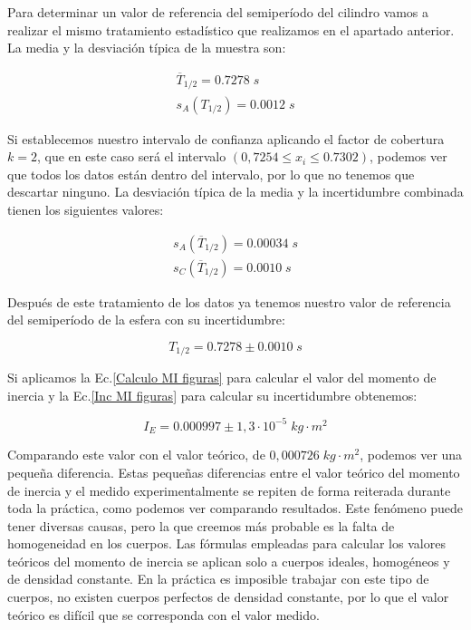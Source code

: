 \documentclass[a4paper,12pt,titlepage]{article}
\begin{document}
Para determinar un valor de referencia del semiperíodo del cilindro vamos a realizar el mismo tratamiento estadístico que realizamos en el apartado anterior. La media y la desviación típica de la muestra son:

\begin{equation}
    \begin{gathered}
        \overline{T}_{1/2} = 0.7278 \; s\\
        s_A(T_{1/2}) = 0.0012 \; s
    \end{gathered}
\end{equation}

Si establecemos nuestro intervalo de confianza aplicando el factor de cobertura $k=2$, que en este caso será el intervalo $(0,7254 \leq x_i \leq 0.7302)$, podemos ver que todos los datos están dentro del intervalo, por lo que no tenemos que descartar ninguno. La desviación típica de la media y la incertidumbre combinada tienen los siguientes valores:

\begin{equation}
    \begin{gathered}
        s_A(\overline{T}_{1/2}) = 0.00034 \; s\\
        s_C(\overline{T}_{1/2}) = 0.0010 \; s
    \end{gathered}
\end{equation}

Después de este tratamiento de los datos ya tenemos nuestro valor de referencia del semiperíodo de la esfera con su incertidumbre:

\begin{equation}
    T_{1/2} = 0.7278 \pm 0.0010 \; s
\end{equation}

Si aplicamos la Ec.\ref{Calculo MI figuras} para calcular el valor del momento de inercia y la Ec.\ref{Inc MI figuras} para calcular su incertidumbre obtenemos:

\begin{equation}
    I_E = 0.000997 \pm  1,3 \cdot 10^{-5} \;kg\cdot m^2
\end{equation}

Comparando este valor con el valor teórico, de $0,000726 \; kg \cdot m^2$, podemos ver una pequeña diferencia. Estas pequeñas diferencias entre el valor teórico del momento de inercia y el medido experimentalmente se repiten de forma reiterada durante toda la práctica, como podemos ver comparando resultados. Este fenómeno puede tener diversas causas, pero la que creemos más probable es la falta de homogeneidad en los cuerpos. Las fórmulas empleadas para calcular los valores teóricos del momento de inercia se aplican solo a cuerpos ideales, homogéneos y de densidad constante. En la práctica es imposible trabajar con este tipo de cuerpos, no existen cuerpos perfectos de densidad constante, por lo que el valor teórico es difícil que se corresponda con el valor medido.
\end{document}
